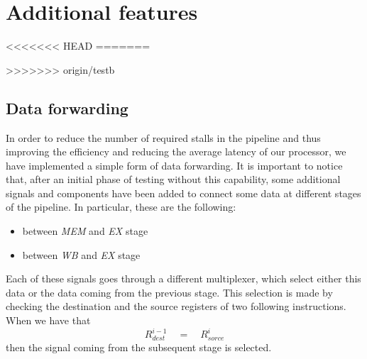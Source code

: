 \chapter{Additional features}
\label{chap_add_feat}
<<<<<<< HEAD
=======



>>>>>>> origin/testb
\section{Data forwarding}
In order to reduce the number of required stalls in the pipeline and thus improving the efficiency and reducing the average latency of our processor, we have implemented a simple form of data forwarding.
It is important to notice that, after an initial phase of testing without this capability, some additional signals and components have been added to connect some data at different stages of the pipeline. In particular, these are the following:
\begin{itemize}
	\item between \textit{MEM} and \textit{EX} stage
	\item between \textit{WB} and \textit{EX} stage
\end{itemize}

Each of these signals goes through a different multiplexer, which select either this data or the data coming from the previous stage. This selection is made by checking the destination and the source registers of two following instructions. When we have that
\[R^{i-1}_{dest}\quad = \quad R^{i}_{sorce}\]
then the signal coming from the subsequent stage is selected.


